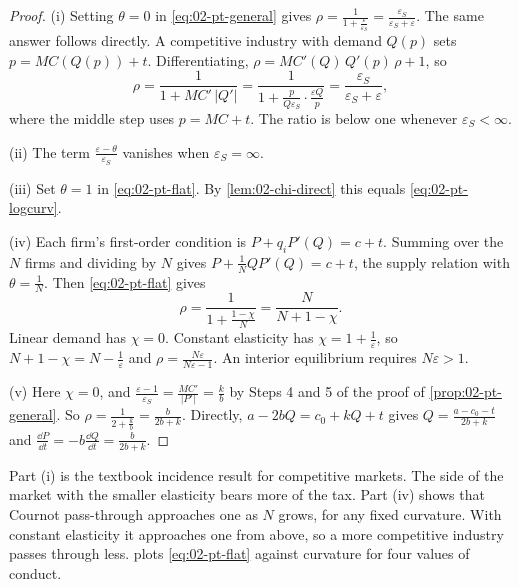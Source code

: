 \begin{proof}
(i) Setting $\theta = 0$ in \eqref{eq:02-pt-general} gives
$\rho = \frac{1}{1 + \frac{\varepsilon}{\varepsilon_S}} = \frac{\varepsilon_S}{\varepsilon_S + \varepsilon}$. The
same answer follows directly. A competitive industry with demand $Q(p)$ sets $p = MC(Q(p)) + t$.
Differentiating, $\rho = MC'(Q)\,Q'(p)\,\rho + 1$, so
\begin{equation*}
\rho = \frac{1}{1 + MC'\,\lvert Q'\rvert} = \frac{1}{1 + \frac{p}{Q\varepsilon_S}\cdot\frac{\varepsilon Q}{p}}
= \frac{\varepsilon_S}{\varepsilon_S + \varepsilon} ,
\end{equation*}
where the middle step uses $p = MC + t$. The ratio is below one whenever $\varepsilon_S < \infty$.

(ii) The term $\frac{\varepsilon - \theta}{\varepsilon_S}$ vanishes when $\varepsilon_S = \infty$.

(iii) Set $\theta = 1$ in \eqref{eq:02-pt-flat}. By \cref{lem:02-chi-direct} this equals
\eqref{eq:02-pt-logcurv}.

(iv) Each firm's first-order condition is $P + q_iP'(Q) = c + t$. Summing over the $N$ firms and dividing by
$N$ gives $P + \frac{1}{N}QP'(Q) = c + t$, the supply relation with $\theta = \frac{1}{N}$. Then
\eqref{eq:02-pt-flat} gives
\begin{equation*}
\rho = \frac{1}{1 + \frac{1 - \chi}{N}} = \frac{N}{N + 1 - \chi} .
\end{equation*}
Linear demand has $\chi = 0$. Constant elasticity has $\chi = 1 + \frac{1}{\varepsilon}$, so
$N + 1 - \chi = N - \frac{1}{\varepsilon}$ and $\rho = \frac{N\varepsilon}{N\varepsilon - 1}$. An interior
equilibrium requires $N\varepsilon > 1$.

(v) Here $\chi = 0$, and $\frac{\varepsilon - 1}{\varepsilon_S} = \frac{MC'}{\lvert P'\rvert} = \frac{k}{b}$ by
Steps 4 and 5 of the proof of \cref{prop:02-pt-general}. So $\rho = \frac{1}{2 + \frac{k}{b}} = \frac{b}{2b + k}$.
Directly, $a - 2bQ = c_0 + kQ + t$ gives $Q = \frac{a - c_0 - t}{2b + k}$ and $\frac{\dd P}{\dd t} = -b\frac{\dd Q}{\dd t} = \frac{b}{2b + k}$.
\end{proof}

Part (i) is the textbook incidence result for competitive markets. The side of the market with the smaller
elasticity bears more of the tax. Part (iv) shows that Cournot pass-through approaches one as $N$ grows, for any
fixed curvature. With constant elasticity it approaches one from above, so a more competitive industry passes
through less.  plots \eqref{eq:02-pt-flat} against curvature for four values of
conduct.

